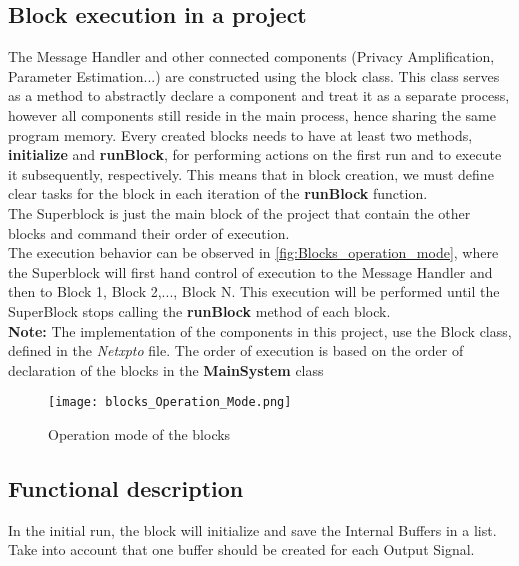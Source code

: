 \begin{refsection}

\subsection{Block execution in a project}
The Message Handler and other connected components (Privacy Amplification, 
Parameter Estimation...) are constructed using the block class. This class 
serves as a method to abstractly declare a component and treat it as a separate 
process, however all components still reside in the main process, hence sharing 
the same program memory. Every created blocks needs to have at least two methods, 
\textbf{initialize} and \textbf{runBlock}, for performing actions on the first run
and to execute it subsequently, respectively. This means that in block creation,
we must define clear tasks for the block in each iteration of the \textbf{runBlock} 
function.
\\
The Superblock is just the main block of the project that contain the other blocks
and command their order of execution.
\\
The execution behavior can be observed in \autoref{fig:Blocks_operation_mode}, where
the Superblock will first hand control of execution to the Message Handler and then to
Block 1, Block 2,..., Block N. This execution will be performed until the SuperBlock stops
calling the \textbf{runBlock} method of each block.
\\
\textbf{Note:} The implementation of the components in this project, use the Block 
class, defined in the \textit{Netxpto} file. The order of execution is  
based on the order of declaration of the blocks in the \textbf{MainSystem} class
\\
\begin{figure}[H]
	\centering
	\texttt{[image: blocks\_Operation\_Mode.png]}
	\caption{Operation mode of the blocks}
	\label{fig:Blocks_operation_mode}
\end{figure}

\subsection{Functional description}
In the initial run, the block will initialize and save the Internal Buffers 
in a list. Take into account that one buffer should be created for each Output 
Signal.
\\

\end{refsection}
